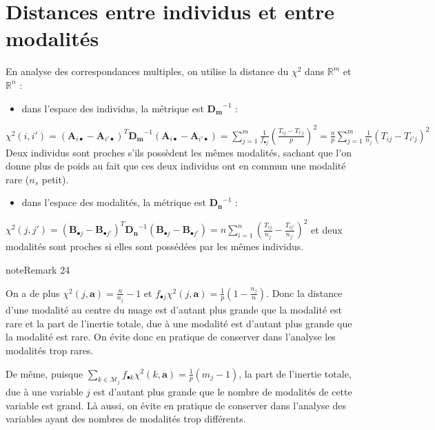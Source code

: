 \documentclass[letterpaper,10pt,english]{jupyterBook}
\begin{document}
\section{Distances entre individus et entre modalités}
\label{\detokenize{acm:distances-entre-individus-et-entre-modalites}}
\sphinxAtStartPar
En analyse des correspondances multiples, on utilise la distance du \(\chi^2\) dans \(\mathbb{R}^m\) et \(\mathbb{R}^n\) :
\begin{itemize}
\item {} 
\sphinxAtStartPar
dans l’espace des individus, la métrique est \(\mathbf {D_m}^{-1}\) :

\end{itemize}

\sphinxAtStartPar
\(\chi^2(i,i') = (\mathbf{A}_{i\bullet}-\mathbf{A}_{i'\bullet})^T\mathbf {D_m}^{-1} (\mathbf{A}_{i\bullet}-\mathbf{A}_{i'\bullet}) = \displaystyle\sum_{j=1}^m\frac{1}{f_{\bullet j}}\left (\frac{T_{ij}-T_{i'j}}{p} \right )^2 = \frac {n}{p}\displaystyle\sum_{j=1}^m\frac{1}{{n_j}}\left (T_{ij}-T_{i'j}\right )^2\)
Deux individus sont proches s’ils possèdent les mêmes modalités, sachant que l’on donne plus de poids au fait que ces deux individus ont en commun une modalité rare (\(n_s\) petit).
\begin{itemize}
\item {} 
\sphinxAtStartPar
dans l’espace des modalités, la métrique est \(\mathbf {D_n}^{-1}\) :

\end{itemize}

\sphinxAtStartPar
\(\chi^2(j,j') = (\mathbf{B}_{\bullet j}-\mathbf{B}_{\bullet j'})^T\mathbf {D_n}^{-1} (\mathbf{B}_{\bullet j}-\mathbf{B}_{\bullet j'}) = n\displaystyle\sum_{i=1}^n\left (\frac{T_{ij}}{n_j} -\frac{T_{ij'}}{n_{j'}}\right )^2\)
et deux modalités sont proches si elles sont possédées par les mêmes individus.
\label{acm:remark-1}
\begin{sphinxadmonition}{note}{Remark 24}



\sphinxAtStartPar
On a de plus  \(\chi^2(j,\mathbf{a}) = \frac{n}{n_j}-1\) et  \(f_{\bullet j}\chi^2(j,\mathbf{a}) = \frac{1}{p}\left( 1-\frac{n_j}{n}\right )\). Donc la distance d’une modalité au centre du nuage est d’autant plus grande que la modalité est rare et la part de l’inertie totale, due à une modalité est d’autant plus grande que la modalité est rare.  On  évite donc en pratique de conserver dans l’analyse les modalités trop rares.

\sphinxAtStartPar
De même, puisque \(\displaystyle\sum_{k\in \mathcal{M}_j}f_{\bullet k}\chi^2(k,\mathbf{a}) = \frac{1}{p}\left( m_j-1\right )\), la part de l’inertie totale, due à une variable  \(j\) est d’autant plus grande que le nombre de modalités  de cette variable est grand. Là aussi, on  évite en pratique de conserver dans l’analyse des variables ayant des nombres de modalités trop différents.
\end{sphinxadmonition}
\end{document}
